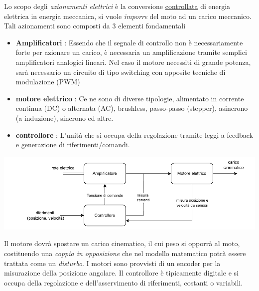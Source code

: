 \documentclass[10pt, letterpaper]{report}
\begin{document}
Lo scopo degli \textit{azionamenti elettrici} è la conversione \underline{controllata} di energia elettrica in energia meccanica, si vuole \textit{imporre} del moto ad un carico meccanico. Tali azionamenti sono composti da 3 elementi fondamentali\begin{itemize}
    \item \textbf{Amplificatori} : Essendo che il segnale di controllo non è necessariamente forte per azionare un carico, è necessaria un amplificazione tramite semplici amplificatori analogici lineari. Nel caso il motore necessiti di grande potenza, sarà necessario un circuito di tipo switching con apposite tecniche di modulazione (PWM)
    \item \textbf{motore elettrico} : Ce ne sono di diverse tipologie, alimentato in corrente continua (DC) o alternata (AC), brushless, passo-passo (stepper), asincrono (a induzione), sincrono ed altre. 
    \item \textbf{controllore} : L'unità che si occupa della regolazione tramite leggi a feedback e generazione di riferimenti/comandi.
\end{itemize}\begin{center}
    \includegraphics[width=1\textwidth ]{images/schemaAzionamento.pdf}
\end{center}
Il motore dovrà spostare un carico cinematico, il cui peso si opporrà al moto, costituendo una 
\textit{coppia in opposizione} che nel modello matematico potrà essere trattata come un \textit{disturbo}. I motori sono provvisti di un encoder per la misurazione della posizione angolare. Il controllore è tipicamente digitale e si occupa della regolazione e dell'asservimento di riferimenti, costanti o variabili. 
\end{document}

